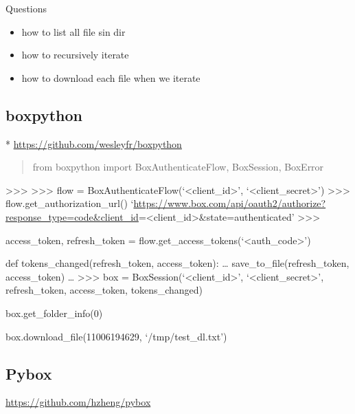 Questions

\begin{itemize}

\item
  how to list all file sin dir
\item
  how to recursively iterate
\item
  how to download each file when we iterate
\end{itemize}

\subsection{boxpython}\label{boxpython}

* \url{https://github.com/wesleyfr/boxpython}

\begin{quote}
from boxpython import BoxAuthenticateFlow, BoxSession, BoxError
\end{quote}

\textgreater{}\textgreater{}\textgreater{}
\textgreater{}\textgreater{}\textgreater{} flow =
BoxAuthenticateFlow(`\textless{}client\_id\textgreater{}',
`\textless{}client\_secret\textgreater{}')
\textgreater{}\textgreater{}\textgreater{}
flow.get\_authorization\_url()
`\url{https://www.box.com/api/oauth2/authorize?response_type=code\&client_id}=\textless{}client\_id\textgreater{}\&state=authenticated'
\textgreater{}\textgreater{}\textgreater{}

access\_token, refresh\_token =
flow.get\_access\_tokens(`\textless{}auth\_code\textgreater{}')

def tokens\_changed(refresh\_token, access\_token): \ldots{}
save\_to\_file(refresh\_token, access\_token) \ldots{}
\textgreater{}\textgreater{}\textgreater{} box =
BoxSession(`\textless{}client\_id\textgreater{}',
`\textless{}client\_secret\textgreater{}', refresh\_token,
access\_token, tokens\_changed)

box.get\_folder\_info(0)

box.download\_file(11006194629, `/tmp/test\_dl.txt')

\subsection{Pybox}\label{pybox}

\url{https://github.com/hzheng/pybox}
